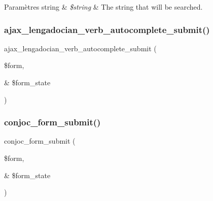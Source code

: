 \begin{DoxyParams}[1]{Paramètres}
string & {\em \$string} & The string that will be searched. \\
\hline
\end{DoxyParams}
\hypertarget{conjoc__lengadocian__web_form_8inc_a2206d720f533b7b1afa6ac0568e740ef}{}\label{conjoc__lengadocian__web_form_8inc_a2206d720f533b7b1afa6ac0568e740ef} 
\subsubsection{\texorpdfstring{ajax\+\_\+lengadocian\+\_\+verb\+\_\+autocomplete\+\_\+submit()}{ajax\_lengadocian\_verb\_autocomplete\_submit()}}
{\footnotesize\ttfamily ajax\+\_\+lengadocian\+\_\+verb\+\_\+autocomplete\+\_\+submit (\begin{DoxyParamCaption}\item[{}]{\$form,  }\item[{\&}]{\$form\+\_\+state }\end{DoxyParamCaption})}

\hypertarget{conjoc__lengadocian__web_form_8inc_ad10d751f3d75ba568eb1f41bd43fcc94}{}\label{conjoc__lengadocian__web_form_8inc_ad10d751f3d75ba568eb1f41bd43fcc94} 
\subsubsection{\texorpdfstring{conjoc\+\_\+form\+\_\+submit()}{conjoc\_form\_submit()}}
{\footnotesize\ttfamily conjoc\+\_\+form\+\_\+submit (\begin{DoxyParamCaption}\item[{}]{\$form,  }\item[{\&}]{\$form\+\_\+state }\end{DoxyParamCaption})}


